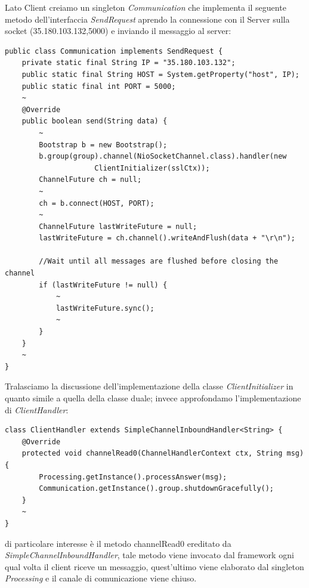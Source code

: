 \newpage
Lato Client creiamo un singleton \textit{Communication} che implementa il seguente metodo dell'interfaccia \textit{SendRequest} aprendo la connessione con il Server sulla socket (35.180.103.132,5000) e inviando il messaggio al server:
\begin{lstlisting}
public class Communication implements SendRequest {
	private static final String IP = "35.180.103.132";
	public static final String HOST = System.getProperty("host", IP);
	public static final int PORT = 5000;
	~
	@Override
	public boolean send(String data) {
		~
		Bootstrap b = new Bootstrap();
		b.group(group).channel(NioSocketChannel.class).handler(new
					 ClientInitializer(sslCtx));
		ChannelFuture ch = null;
		~
		ch = b.connect(HOST, PORT);
		~
		ChannelFuture lastWriteFuture = null;
		lastWriteFuture = ch.channel().writeAndFlush(data + "\r\n");
		
		//Wait until all messages are flushed before closing the channel
		if (lastWriteFuture != null) {
			~
			lastWriteFuture.sync();
			~
		}		
	}
	~
}
\end{lstlisting}
Tralasciamo la discussione dell'implementazione della classe \textit{ClientInitializer} in quanto simile a quella della classe duale; invece approfondamo l'implementazione di \textit{ClientHandler}: 
\begin{lstlisting}
class ClientHandler extends SimpleChannelInboundHandler<String> {
	@Override
	protected void channelRead0(ChannelHandlerContext ctx, String msg) {
		Processing.getInstance().processAnswer(msg);
		Communication.getInstance().group.shutdownGracefully();
	}
	~
}
\end{lstlisting}
di particolare interesse è il metodo channelRead0 ereditato da \textit{SimpleChannelInboundHandler}, tale metodo viene invocato dal framework ogni qual volta il client riceve un messaggio, quest'ultimo viene elaborato dal singleton \textit{Processing} e il canale di comunicazione viene chiuso.








